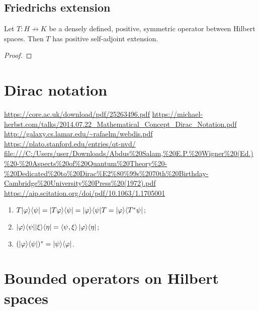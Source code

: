\subsection{Friedrichs extension}
\begin{proposition}
Let $T: H\not\to K$ be a densely defined, positive, symmetric operator between Hilbert spaces. Then $T$ has positive self-adjoint extension.
\end{proposition}
\begin{proof}

\end{proof}


\section{Dirac notation}
\url{https://core.ac.uk/download/pdf/25263496.pdf}
\url{https://michael-herbst.com/talks/2014.07.22_Mathematical_Concept_Dirac_Notation.pdf}
\url{http://galaxy.cs.lamar.edu/~rafaelm/webdis.pdf}
\url{https://plato.stanford.edu/entries/qt-nvd/}
\url{file:///C:/Users/user/Downloads/Abdus%20Salam,%20E.P.%20Wigner%20(Ed.)%20-%20Aspects%20of%20Quantum%20Theory%20-%20Dedicated%20to%20Dirac%E2%80%99s%2070th%20Birthday-Cambridge%20University%20Press%20(1972).pdf}
\url{https://aip.scitation.org/doi/pdf/10.1063/1.1705001}

\begin{lemma}
\begin{enumerate}
\item $T|\varphi\rangle\langle\psi| = |T\varphi\rangle\langle\psi| = |\varphi\rangle\langle\psi|T = |\varphi\rangle\langle T^*\psi|$;
\item $|\varphi\rangle\langle\psi||\xi\rangle\langle\eta| = \left\langle \psi, \xi \right\rangle|\varphi\rangle\langle\eta|$;
\item $(|\varphi\rangle\langle\psi|)^* = |\psi\rangle\langle\varphi|$.
\end{enumerate}
\end{lemma}

\section{Bounded operators on Hilbert spaces}

